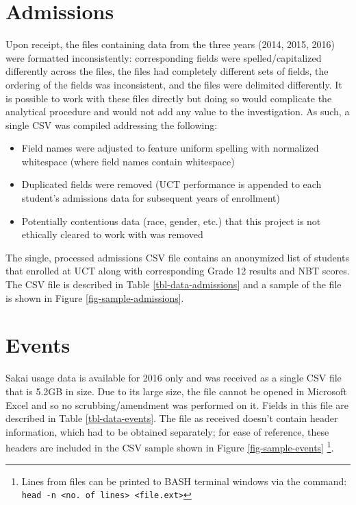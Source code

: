 \section{Admissions}
Upon receipt, the files containing data from the three years (2014, 2015, 2016) were formatted inconsistently: corresponding fields were spelled/capitalized differently across the files, the files had completely different sets of fields, the ordering of the fields was inconsistent, and the files were delimited differently. It is possible to work with these files directly but doing so would complicate the analytical procedure and would not add any value to the investigation. As such, a single CSV was compiled addressing the following:

\begin{itemize}
    \item Field names were adjusted to feature uniform spelling with normalized whitespace (where field names contain whitespace)
    \item Duplicated fields were removed (UCT performance is appended to each student's admissions data for subsequent years of enrollment)
    \item Potentially contentious data (race, gender, etc.) that this project is not ethically cleared to work with was removed
\end{itemize}

The single, processed admissions CSV file contains an anonymized list of students that enrolled at UCT along with corresponding Grade 12 results and NBT scores. The CSV file is described in Table \ref{tbl-data-admissions} and a sample of the file is shown in Figure \ref{fig-sample-admissions}.

\section{Events}
Sakai usage data is available for 2016 only and was received as a single CSV file that is 5.2GB in size. Due to its large size, the file cannot be opened in Microsoft Excel and so no scrubbing/amendment was performed on it. Fields in this file are described in Table \ref{tbl-data-events}. The file as received doesn't contain header information, which had to be obtained separately; for ease of reference, these headers are included in the CSV sample shown in Figure \ref{fig-sample-events} \footnote{Lines from files can be printed to BASH terminal windows via the command: \texttt{head -n <no. of lines> <file.ext>}}.





